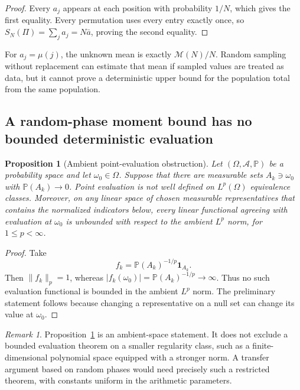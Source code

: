 \documentclass[11pt]{amsart}
\numberwithin{equation}{section}
\theoremstyle{plain}
\newtheorem{proposition}[theorem]{Proposition}
\theoremstyle{definition}
\theoremstyle{remark}
\newtheorem{remark}[theorem]{Remark}
\newcommand{\Mertens}{\mathcal M}
\newcommand{\one}{\mathbf 1}
\begin{document}
\begin{proof}
Every \(a_j\) appears at each position with probability \(1/N\), which gives
the first equality.  Every permutation uses every entry exactly once, so
\(S_N(\Pi)=\sum_j a_j=N\bar a\), proving the second equality.
\end{proof}

For \(a_j=\mu(j)\), the unknown mean is exactly \(\Mertens(N)/N\).  Random
sampling without replacement can estimate that mean if sampled values are
treated as data, but it cannot prove a deterministic upper bound for the
population total from the same population.

\subsection{A random-phase moment bound has no bounded deterministic evaluation}

\begin{proposition}[Ambient point-evaluation obstruction]
\label{prop:evaluation}
Let \((\Omega,\mathcal A,\mathbb P)\) be a probability space and let
\(\omega_0\in\Omega\).  Suppose that there are measurable sets
\(A_k\ni\omega_0\) with \(\mathbb P(A_k)\to0\).  Point evaluation is not
well defined on \(L^p(\Omega)\) equivalence classes.  Moreover, on any linear
space of chosen measurable representatives that contains the normalized
indicators below, every linear functional agreeing with evaluation at
\(\omega_0\) is unbounded with respect to the ambient \(L^p\) norm, for
\(1\leq p<\infty\).
\end{proposition}

\begin{proof}
Take
\begin{equation}
 f_k=\mathbb P(A_k)^{-1/p}\one_{A_k}.
 \label{eq:point-evaluation-test-functions}
\end{equation}
Then \(\|f_k\|_p=1\), whereas
\(|f_k(\omega_0)|=\mathbb P(A_k)^{-1/p}\to\infty\).  Thus no such evaluation
functional is bounded in the ambient \(L^p\) norm.  The preliminary statement
follows because changing a representative on a null set can change its value
at \(\omega_0\).
\end{proof}

\begin{remark}
\label{rem:restricted-evaluation}
Proposition~\ref{prop:evaluation} is an ambient-space statement.  It does not
exclude a bounded evaluation theorem on a smaller regularity class, such as a
finite-dimensional polynomial space equipped with a stronger norm.  A
transfer argument based on random phases would need precisely such a
restricted theorem, with constants uniform in the arithmetic parameters.
\end{remark}
\end{document}
